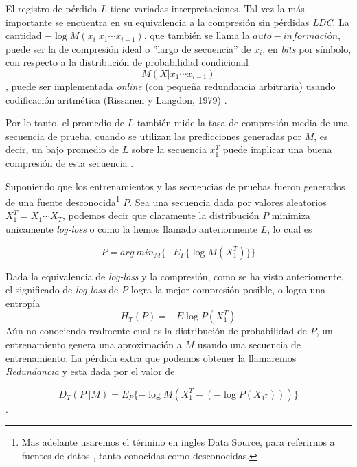 El registro de pérdida $L$ tiene variadas interpretaciones. Tal vez la más importante se encuentra en su equivalencia a la compresión sin pérdidas \emph{LDC}. La cantidad $- \log M (x_{i} | x_{1} \cdots x_{i-1}) $, que también se llama la $auto-información$, puede ser la de compresión ideal o ''largo de secuencia'' de $x_{i}$, en \emph{bits} por símbolo, con respecto a la distribución de probabilidad condicional  \begin{equation}M (X | x_{1} \cdots x_{i-1})\end{equation}, puede ser implementada \emph{online} (con  pequeña redundancia arbitraria) usando codificación aritmética (Rissanen y Langdon, 1979)\cite{RissanenLangdon1979} .


Por lo tanto, el promedio de $L$ también mide la tasa de compresión media de una secuencia de prueba, cuando se utilizan las predicciones generadas por $M$, es decir, un bajo promedio de $L$ %
sobre la secuencia $x_{1}^{T}$ puede implicar una buena compresión de esta secuencia \cite{Begleiter2004}.

Suponiendo que los entrenamientos y las secuencias de pruebas fueron generados de una fuente desconocida\footnote{Mas adelante usaremos el término en ingles Data Source, para referirnos a fuentes de datos , tanto conocidas como desconocidas.} $P$. Sea una secuencia dada por valores aleatorios $X_{1}^{T} = X_{1} \cdots X_{T} $, podemos decir que claramente la distribución $P$ minimiza unicamente \emph{log-loss} o como la hemos llamado anteriormente $L$, lo cual es

\begin{equation}
P = arg\ min_{M} \{ - E_{P} \{\log M( X_{1}^{T} )\}   \}
\end{equation}


Dada la equivalencia de \emph{log-loss} y la compresión, como se ha visto anteriomente, el significado de \emph{log-loss} de $P$ logra la mejor compresión posible, o logra una entropía 
\begin{equation}
	H_{T}(P) = - E \log P( X_{1}^{T} ) 
\end{equation}
Aún no conociendo realmente cual es la distribución de probabilidad de $P$, un entrenamiento genera una aproximación a $M$ usando una secuencia de entrenamiento. La pérdida extra que podemos obtener la llamaremos \emph{Redundancia} y esta dada por el valor de

\begin{equation}
D_{T} ( P || M ) = E_{P} \{ - \log M(X_{1}^{T} - (- \log P(X_{1^{T}})   )  )       \} 
\end{equation}.
 

